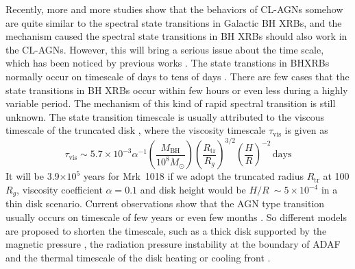 \documentclass[twocolumn]{aastex63}
\begin{document}
Recently, more and more studies show that the behaviors of CL-AGNs somehow are quite similar to the spectral state transitions in Galactic BH XRBs, and the mechanism caused the spectral state transitions in BH XRBs should also work in the CL-AGNs. However, this will bring a serious issue about the time scale, which has been noticed by previous works \citep[e.g. ][]{2018NatAs...2..102L,2018ApJ...864...27S,2018MNRAS.480.3898N,2020MNRAS.492.2335L}. The state transtions in BHXRBs normally occur on timescale of days to tens of days \citep{2009ApJ...701.1940Y,2010MNRAS.403...61D}. There are few cases that the state transitions in BH XRBs occur within few hours or even less \citep[e.g.][]{2011A&A...533A...8B,2020A&A...634A..94K} during a highly variable period. The mechanism of this kind of rapid spectral transition is still unknown. The state transition timescale is usually
attributed to the viscous timescale of the truncated disk \citep[see reviews in ][]{2007A&ARv..15....1D}, where the viscosity timescale $\tau_\mathrm{vis}$ is given as
\begin{equation}
\tau_\mathrm{vis} \sim 5.7\times 10^{-3} \alpha^{-1}(\frac{M_\mathrm{BH}}{10^8M_{\odot}})(\frac{R_\mathrm{tr}}{R_g})^{3/2} (\frac{H}{R})^{-2} \, \mathrm{days}
\end{equation} It will be 3.9$\times 10^5$ years for Mrk~1018 if we adopt the truncated radius $R_\mathrm{tr}$ at 100 $R_g$, viscosity coefficient $\alpha=0.1$ and disk height would be $H/R~\sim 5\times10^{-4}$ \citep[see also][]{2018MNRAS.480.3898N} in a thin disk scenario. Current observations show that the AGN type transition usually occurs on timescale of few years \citep[e.g.][]{2016A&A...593L...8M,2018ApJ...864...27S,2019MNRAS.483L..88P,2020MNRAS.492.2335L} or even few months \citep{2019ApJ...883...94T}. So different models are proposed to shorten the timescale, such as a thick disk supported by the magnetic pressure \citep{2019MNRAS.483L..17D}, the radiation pressure instability at the boundary of ADAF \citep{2019arXiv190406767S} and the thermal timescale of the disk heating or cooling front \citep{2018ApJ...864...27S}. 
\end{document}
